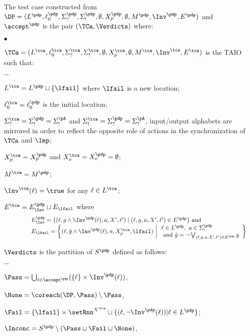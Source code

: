 \documentclass{LMCS}
\theoremstyle{plain}\newtheorem{proposition}[thm]{Proposition}
\begin{document}
The test case constructed from
$\DP=(L^\pdp,\ell_0^\pdp,\Sigma_?^\pdp,\Sigma_!^\pdp,\emptyset,X_p^\pdp,\emptyset,M^\pdp,\Inv^\pdp,E^\pdp)$
and $\accept^\pdp$ is the pair $(\TCa, \Verdicts)$
where:
\begin{iteMize}{$\bullet$}
\item $\TCa=(L^\tca,\ell_0^\tca,\Sigma_?^\tca,\Sigma_!^\tca,\emptyset ,X_p^\tca,\emptyset,M^\tca,\Inv^\tca,E^\tca)$ is the TAIO
such that: 
\begin{iteMize}{$-$}
\item $L^\tca= L^\pdp \sqcup \{\lfail\}$ where $\lfail$ is a new
location; 
\item $\ell_0^\tca=\ell_0^\pdp$ is the initial location;
\item $\Sigma_?^\tca=\Sigma_!^\pdp=\Sigma_!^\pA$ and
$\Sigma_!^\tca=\Sigma_?^\pdp=\Sigma_?^\pA$, \ie input/output alphabets
are mirrored in order to reflect the opposite role of actions in the
synchronization of $\TCa$ and $\Imp$; 
\item $X_p^\tca = X_p^\pdp$ and
$X_o^\tca=X_o^\pdp=\emptyset$; 
\item $M^\tca = M^\pdp$; 
\item $\Inv^\tca(\ell)=\true$ for any $\ell \in L^\tca$; 
\item $E^\tca=E_\Inv^\pdp
\sqcup E_{\lfail}$ where
$$ \quad \quad \quad \quad 
\begin{array}{l}
E_\Inv^\pdp=\{(\ell,g\wedge\Inv^\pdp(\ell),a,X',\ell') \mid
(\ell,g,a,X',\ell') \in E^\pdp\} \mbox{ and}\\
E_{\lfail}=\left \{(\ell,\bar{g}\wedge\Inv^\pdp(\ell),a,X_p^\tca,\lfail) \,  \left|\, 
\begin{array}{l}
\ell \in L^\pdp,\ a \in \Sigma_!^\pdp \\
\textrm{ and } \bar{g}= \neg \bigvee_{(\ell,g,a,X',\ell') \in
  E^\pdp} g \end{array} \right\}\right. \end{array}$$
\end{iteMize}
\item 
 $\Verdicts$ is the partition of $S^\pdp$ defined as follows:
\begin{iteMize}{$-$}
\item $\Pass=
\bigcup_{\ell\in\accept^\pdp} (\{\ell\}\times\Inv^\pdp(\ell))$,
\item $\None =
\coreach(\DP,\Pass) \setminus \Pass$, 
\item $\Fail=\{\lfail\} \times \setRnn^{X^\tca} \sqcup
\{(\ell,\neg \Inv^\pdp(\ell)) | \ell \in L^\pdp\}$;
\item $\Inconc= S^\pdp \setminus
(\Pass \sqcup \Fail \sqcup \None)$,
 \end{iteMize}
\end{iteMize}\medskip
\end{document}
